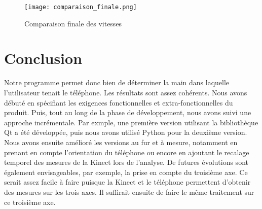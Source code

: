 \documentclass[12pt, french]{article}
\begin{document}
\begin{figure}[H]
\centering
\texttt{[image: comparaison\_finale.png]}
\caption{Comparaison finale des vitesses}
\label{fig11}
\end{figure}



\section{Conclusion}
Notre programme permet donc bien de déterminer la main dans laquelle l'utilisateur tenait le téléphone. Les résultats sont assez cohérents. Nous avons débuté en spécifiant les exigences fonctionnelles et extra-fonctionnelles du produit. Puis, tout au long de la phase de développement, nous avons suivi une approche incrémentale. Par exmple, une première version utilisant la bibliothèque Qt a été développée, puis nous avons utilisé Python pour la deuxième version. Nous avons ensuite amélioré les versions au fur et à mesure, notamment en prenant en compte l'orientation du téléphone ou encore en ajoutant le recalage temporel des mesures de la Kinect lors de l'analyse. De futures évolutions sont également envisageables, par exemple, la prise en compte du troisième axe. Ce serait assez facile à faire puisque la Kinect et le téléphone permettent d'obtenir des mesures sur les trois axes. Il suffirait ensuite de faire le même traitement sur ce troisième axe.
\end{document}
